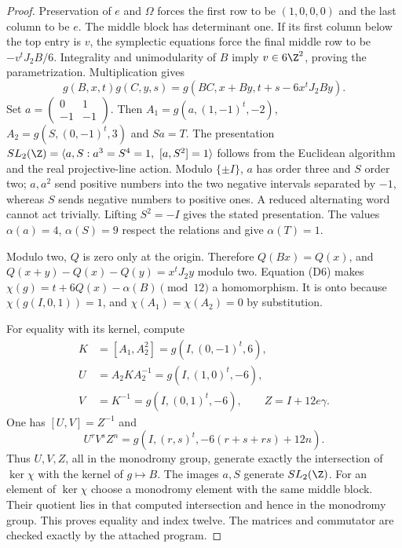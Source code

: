 \begin{proof}
Preservation of $e$ and $\Omega$ forces the first row to be
$(1,0,0,0)$ and the last column to be $e$. The middle block has
determinant one. If its first column below the top entry is $v$,
the symplectic equations force the final middle row to be
$-v^tJ_2B/6$. Integrality and unimodularity of $B$ imply
$v\in6\Z^2$, proving the parametrization. Multiplication gives
\[
g(B,x,t)g(C,y,s)=g(BC,x+By,t+s-6x^tJ_2By).             \tag{D6}
\]
Set $a=\left(\begin{smallmatrix}0&1\\-1&-1\end{smallmatrix}\right)$.
Then $A_1=g(a,(1,-1)^t,-2)$,
$A_2=g(S,(0,-1)^t,3)$ and $Sa=T$.
The presentation
$SL_2(\Z)=\langle a,S:a^3=S^4=1,\ [a,S^2]=1\rangle$
follows from the Euclidean algorithm and the real projective-line
action. Modulo $\{\pm I\}$, $a$ has order three and $S$ order
two; $a,a^2$ send positive numbers into the two negative intervals
separated by $-1$, whereas $S$ sends negative numbers to positive
ones. A reduced alternating word cannot act trivially. Lifting
$S^2=-I$ gives the stated presentation. The values
$\alpha(a)=4$, $\alpha(S)=9$ respect the relations and give
$\alpha(T)=1$.

Modulo two, $Q$ is zero only at the origin. Therefore
$Q(Bx)=Q(x)$, and
$Q(x+y)-Q(x)-Q(y)=x^tJ_2y$ modulo two.
Equation (D6) makes
$\chi(g)=t+6Q(x)-\alpha(B)\pmod{12}$ a homomorphism.
It is onto because $\chi(g(I,0,1))=1$, and
$\chi(A_1)=\chi(A_2)=0$ by substitution.

For equality with its kernel, compute
\[
\begin{aligned}
K&=[A_1,A_2^2]=g(I,(0,-1)^t,6),\\
U&=A_2KA_2^{-1}=g(I,(1,0)^t,-6),\\
V&=K^{-1}=g(I,(0,1)^t,-6),\qquad Z=I+12e\gamma.
\end{aligned}
\]
One has $[U,V]=Z^{-1}$ and
\[
U^rV^sZ^n=g(I,(r,s)^t,-6(r+s+rs)+12n).
\]
Thus $U,V,Z$, all in the monodromy group, generate exactly the
intersection of $\ker\chi$ with the kernel of $g\mapsto B$.
The images $a,S$ generate $SL_2(\Z)$.
For an element of $\ker\chi$ choose a monodromy element with the
same middle block. Their quotient lies in that computed
intersection and hence in the monodromy group. This proves equality
and index twelve. The matrices and commutator are checked exactly
by the attached program.
\end{proof}



